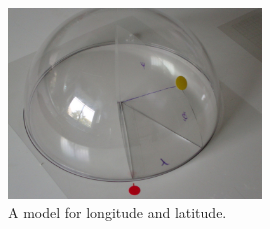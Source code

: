 \documentclass[a4paper,12pt]{article}
\begin{document}
\begin{figure}[h]
\begin{center}
\includegraphics[width=0.6\textwidth]{latlon.jpg}
\caption{A model for longitude and latitude.}
\end{center}
\end{figure}
\end{document}
